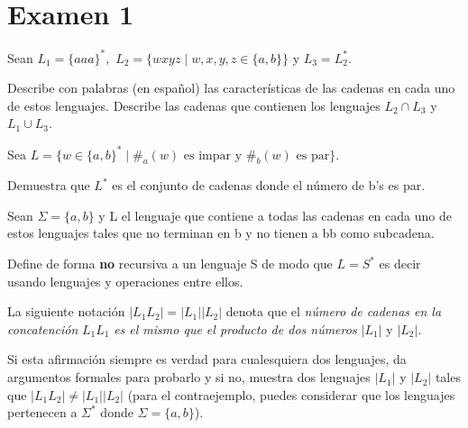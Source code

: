 \renewcommand{\labelenumi}{\alph{enumi})}

\section*{Examen 1}

\begin{questions}
\question Sean $L_{1} = \{aaa\}^{*},$ $L_{2} = \{wxyz \mid w,x,y,z \in \{a,b\} \}$ y $L_{3} = L_{2}^{*}$.

Describe con palabras (en español) las características de las cadenas en cada uno de estos lenguajes.
Describe las cadenas que contienen los lenguajes $L_{2} \cap L_{3}$ y $L_{1} \cup L_{3}$.

\begin{solution}
    
    
    
\end{solution} 
\question Sea $L = \{w \in \{a,b\}^{*} \mid \#_{a}(w) \text{ es impar y } \#_{b} (w) \text{ es par} \}$.

Demuestra que $L^{*}$ es el conjunto de cadenas donde el n\'umero de b's es par.



\question Sean $\Sigma = \{a,b\}$  y L el lenguaje que contiene a todas las cadenas en cada
uno de estos lenguajes tales que no terminan en b y no tienen a bb como subcadena.

Define de forma {\bf no} recursiva a un lenguaje S de modo que $L = S^{*}$ es decir usando lenguajes
y operaciones entre ellos.

\question La siguiente notaci\'on $|L_{1}L_{2}| = |L_{1}||L_{2}|$ denota que el {\it número de cadenas en la concatención}
$L_{1}L_{1}$ {\it es el mismo que el producto de dos n\'umeros $|L_{1}|$} y $|L_{2}|$.

Si esta afirmaci\'on siempre es verdad para cualesquiera dos lenguajes, da argumentos
formales para probarlo y si no, muestra dos lenguajes $|L_{1}|$ y $|L_{2}|$ tales que $|L_{1}L_{2}| \neq |L_{1}||L_{2}|$ (para el
contraejemplo, puedes considerar que los lenguajes pertenecen a $\Sigma^{*}$ donde $\Sigma = \{a,b\}$).
\end{questions}
